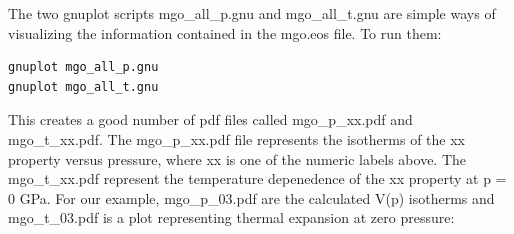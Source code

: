 \documentclass[a4paper]{article}
\begin{document}
The two gnuplot scripts mgo\_all\_p.gnu and mgo\_all\_t.gnu are simple
ways of visualizing the information contained in the mgo.eos file. To
run them:
%
\asciilist
\begin{lstlisting}
gnuplot mgo_all_p.gnu
gnuplot mgo_all_t.gnu
\end{lstlisting}

This creates a good number of pdf files called mgo\_p\_xx.pdf
and mgo\_t\_xx.pdf. The mgo\_p\_xx.pdf file represents the isotherms of
the xx property versus pressure, where xx is one of the numeric labels
above. The mgo\_t\_xx.pdf represent the temperature depenedence of the
xx property at p = 0 GPa. For our example, mgo\_p\_03.pdf are the
calculated V(p) isotherms and mgo\_t\_03.pdf is a plot representing
thermal expansion at zero pressure:

\noindent{}

\noindent{}
\end{document}
